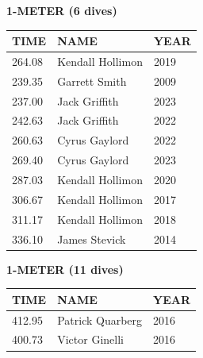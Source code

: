 \begin{table}[H]
\centering
\begin{minipage}[t]{0.6\textwidth}
\centering
\textbf{1-METER (6 dives)}\\[0.1cm]
\begin{tabular}{@{}p{1.8cm}p{2.8cm}p{1.2cm}@{}}
\hline
    \textbf{TIME} & \textbf{NAME} & \textbf{YEAR} \\
\hline
    264.08 & Kendall Hollimon & 2019 \\
    239.35 & Garrett Smith & 2009 \\
    237.00 & Jack Griffith & 2023 \\
    242.63 & Jack Griffith & 2022 \\
    260.63 & Cyrus Gaylord & 2022 \\
    269.40 & Cyrus Gaylord & 2023 \\
    287.03 & Kendall Hollimon & 2020 \\
    306.67 & Kendall Hollimon & 2017 \\
    311.17 & Kendall Hollimon & 2018 \\
    336.10 & James Stevick & 2014 \\
\hline
\end{tabular}
\end{minipage}
\end{table}

\begin{table}[H]
\centering
\begin{minipage}[t]{0.6\textwidth}
\centering
\textbf{1-METER (11 dives)}\\[0.1cm]
\begin{tabular}{@{}p{1.8cm}p{2.8cm}p{1.2cm}@{}}
\hline
    \textbf{TIME} & \textbf{NAME} & \textbf{YEAR} \\
\hline
    412.95 & Patrick Quarberg & 2016 \\
    400.73 & Victor Ginelli & 2016 \\
\hline
\end{tabular}
\end{minipage}
\end{table}

